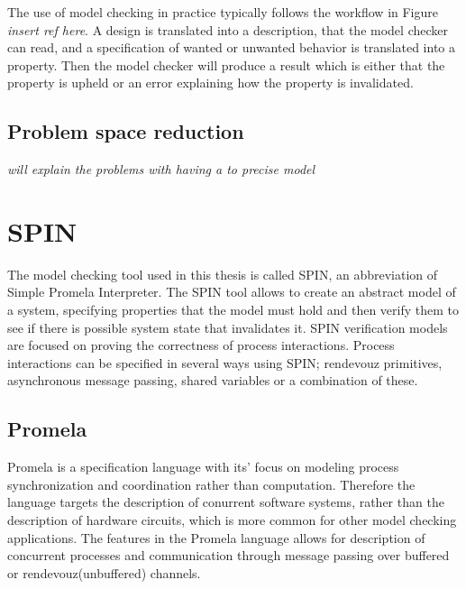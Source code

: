 
The use of model checking in practice typically follows the workflow in Figure \textit{insert ref here}. A design is translated into a description, that the model checker can read, and a specification of wanted or unwanted behavior is translated into a property. Then the model checker will produce a result which is either that the property is upheld or an error explaining how the property is invalidated. 

\subsection{Problem space reduction}

\textit{will explain the problems with having a to precise model}

\section{SPIN}

The model checking tool used in this thesis is called SPIN, an abbreviation of Simple Promela Interpreter. The SPIN tool allows to create an abstract model of a system, specifying properties that the model must hold and then verify them to see if there is possible system state that invalidates it. SPIN verification models are focused on proving the correctness of process interactions.\cite{holzmann1997model} Process interactions can be specified in several ways using SPIN; rendevouz primitives, asynchronous message passing, shared variables or a combination of these. 



\subsection{Promela}
Promela is a specification language with its' focus on modeling process synchronization and coordination rather than computation. Therefore the language targets the description of conurrent software systems, rather than the description of hardware circuits, which is more common for other model checking applications\cite{holzmann1997model}.
The features in the Promela language allows for description of concurrent processes and communication through message passing over buffered or rendevouz(unbuffered) channels.  

